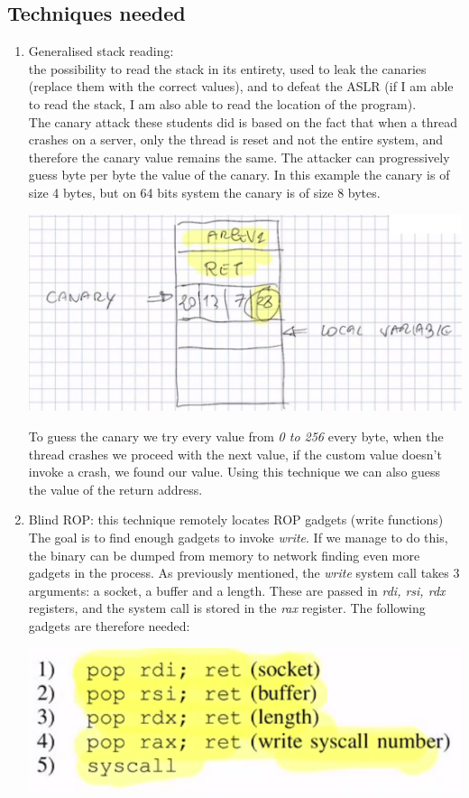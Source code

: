 \documentclass[11pt, oneside]{article}   	%
\begin{document}
\subsection*{Techniques needed}
\begin{enumerate}
\item Generalised stack reading: \\
the possibility to read the stack in its entirety, used to leak the canaries (replace them with the correct values), and to defeat the ASLR (if I am able to read the stack, I am also able to read the location of the program).\\
The canary attack these students did is based on the fact that when a thread crashes on a server, only the thread is reset and not the entire system, and therefore the canary value remains the same. The attacker can progressively guess byte per byte the value of the canary. In this example the canary is of size 4 bytes, but on 64 bits system the canary is of size 8 bytes.
\begin{center}
\includegraphics[scale = 0.5]{cattack}
\end{center}
To guess the canary we try every value from \emph{0 to 256} every byte, when the thread crashes we proceed with the next value, if the custom value doesn't invoke a crash, we found our value. Using this technique we can also guess the value of the return address.

\item Blind ROP: this technique remotely locates ROP gadgets (write functions)\\
The goal is to find enough gadgets to invoke \emph{write}. If we manage to do this, the binary can be dumped from memory to network finding even more gadgets in the process. As previously mentioned, the \emph{write} system call takes 3 arguments: a socket, a buffer and a length. These are passed in \emph{rdi, rsi, rdx} registers, and the system call is stored in the \emph{rax} register. The following gadgets are therefore needed:
\begin{center}
\includegraphics[scale = 0.5]{gadg}
\end{center}

\end{enumerate}
\end{document}
